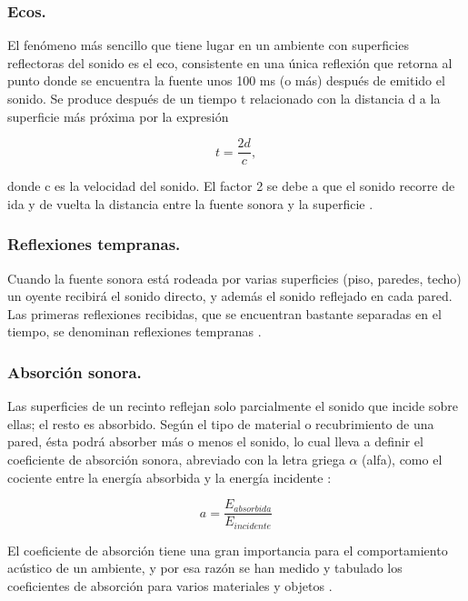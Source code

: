 \subsubsection{Ecos.} El fenómeno más sencillo que tiene lugar en un ambiente con superficies reflectoras del sonido es el eco, consistente en una única reflexión que retorna al punto donde se encuentra la fuente unos 100 ms (o más) después de emitido el sonido. Se produce después de un tiempo t relacionado con la distancia d a la superficie más próxima por la expresión

\begin{equation}
t = \frac{2d}{c},
\end{equation}

donde c es la velocidad del sonido. El factor 2 se debe a que el sonido recorre de ida y de vuelta la distancia entre la fuente sonora y la superficie \cite{Miyara2004}.

\subsubsection{Reflexiones tempranas.} Cuando la fuente sonora está rodeada por varias superficies (piso, paredes, techo) un oyente recibirá el sonido directo, y además el sonido reflejado en cada pared. Las primeras reflexiones recibidas, que se encuentran bastante separadas en el tiempo, se denominan reflexiones tempranas \cite{Miyara2004}.

\subsubsection{Absorción sonora.} Las superficies de un recinto reflejan solo parcialmente el sonido que incide sobre ellas; el resto es absorbido. Según el tipo de material o recubrimiento de una pared, ésta podrá absorber más o menos el sonido, lo cual lleva a definir el coeficiente de absorción sonora, abreviado con la letra griega $\alpha$ (alfa), como el cociente entre la energía absorbida y la energía incidente \cite{Miyara2004}:

\begin{equation}
a = \frac{E_{absorbida}}{E_{incidente}}
\end{equation}

El coeficiente de absorción tiene una gran importancia para el comportamiento acústico de un ambiente, y por esa razón se han medido y tabulado los coeficientes de absorción para varios materiales y objetos \cite{Miyara2004}.

